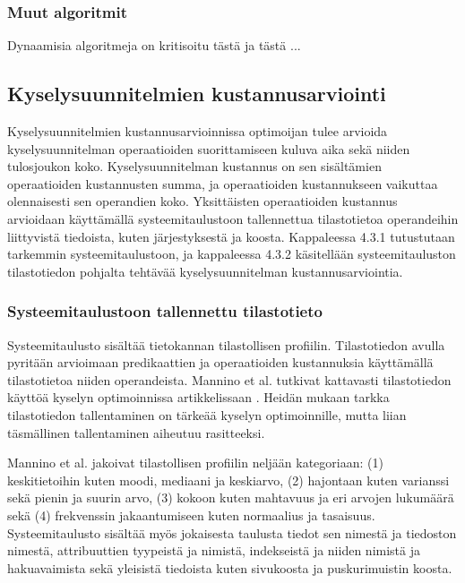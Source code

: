 \documentclass[finnish]{tktltiki2}
\theoremstyle{definition}
\theoremstyle{remark}
\begin{document}
\subsubsection{Muut algoritmit}
Dynaamisia algoritmeja on kritisoitu tästä ja tästä \cite{tähän}...

\subsection{Kyselysuunnitelmien kustannusarviointi}

Kyselysuunnitelmien kustannusarvioinnissa optimoijan tulee arvioida kyselysuunnitelman operaatioiden suorittamiseen kuluva aika sekä niiden tulosjoukon koko. Kyselysuunnitelman kustannus on sen sisältämien operaatioiden kustannusten summa, ja operaatioiden kustannukseen vaikuttaa olennaisesti sen operandien koko. Yksittäisten operaatioiden kustannus arvioidaan käyttämällä systeemitaulustoon tallennettua tilastotietoa operandeihin liittyvistä tiedoista, kuten järjestyksestä ja koosta. Kappaleessa 4.3.1 tutustutaan tarkemmin systeemitaulustoon, ja kappaleessa 4.3.2 käsitellään systeemitauluston tilastotiedon pohjalta tehtävää kyselysuunnitelman kustannusarviointia.


\subsubsection{Systeemitaulustoon tallennettu tilastotieto}
Systeemitaulusto sisältää tietokannan tilastollisen profiilin. Tilastotiedon avulla pyritään arvioimaan predikaattien ja operaatioiden kustannuksia käyttämällä tilastotietoa niiden operandeista. Mannino et al. tutkivat kattavasti tilastotiedon käyttöä kyselyn optimoinnissa artikkelissaan \cite{mannino1988statistical}. Heidän mukaan tarkka tilastotiedon tallentaminen on tärkeää kyselyn optimoinnille, mutta liian täsmällinen tallentaminen aiheutuu rasitteeksi.

Mannino et al. jakoivat tilastollisen profiilin neljään kategoriaan: (1) keskitietoihin kuten moodi, mediaani ja keskiarvo,  (2) hajontaan kuten varianssi sekä pienin ja suurin arvo, (3) kokoon kuten mahtavuus ja eri arvojen lukumäärä sekä (4) frekvenssin jakaantumiseen kuten normaalius ja tasaisuus. Systeemitaulusto sisältää myös jokaisesta taulusta tiedot sen nimestä ja tiedoston nimestä,  attribuuttien tyypeistä ja nimistä, indekseistä ja niiden nimistä ja hakuavaimista sekä yleisistä tiedoista kuten sivukoosta ja puskurimuistin koosta.
\end{document}
